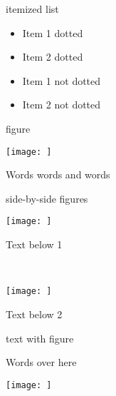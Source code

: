 \documentclass[mathserif, 11pt, t]{beamer}
\begin{document}

\begin{frame}{itemized list}
\begin{itemize}[label={$\cdot$}]
\item Item 1 dotted
\item Item 2 dotted
\end{itemize}
\bigskip

\begin{itemize}
\item Item 1 not dotted
\item Item 2 not dotted
\end{itemize}

\end{frame}

\begin{frame}{figure}
\begin{minipage}{1.00\textwidth}
\begin{center}
\texttt{[image: ]}
\end{center}
Words words and words
\end{minipage}
\end{frame}

\begin{frame}{side-by-side figures}
\begin{minipage}{0.50\textwidth}
\begin{center}
\texttt{[image: ]}
\end{center}
Text below 1
\end{minipage}~~~~~
\begin{minipage}{0.50\textwidth}
\begin{center}
\texttt{[image: ]}
\end{center}
Text below 2
\end{minipage}
\end{frame}

\begin{frame}{text with figure}

\begin{minipage}[t]{0.53\textwidth}
Words over here

\end{minipage}
\hfill
\begin{minipage}[t]{0.45\textwidth}
\vspace{0pt}
\texttt{[image: ]}
\end{minipage}
\end{frame}
\end{document}
